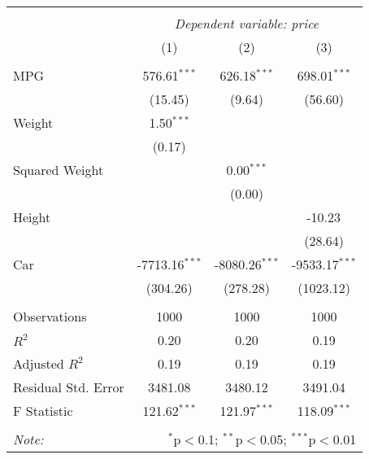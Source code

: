 
\begin{tabular}{@{\extracolsep{5pt}}lccc}
\\[-1.8ex]\hline
\hline \\[-1.8ex]
& \multicolumn{3}{c}{\textit{Dependent variable: price}} \
\cr \cline{2-4}
\\[-1.8ex] & (1) & (2) & (3) \\
\hline \\[-1.8ex]
 MPG & 576.61$^{***}$ & 626.18$^{***}$ & 698.01$^{***}$ \\
& (15.45) & (9.64) & (56.60) \\
 Weight & 1.50$^{***}$ & & \\
& (0.17) & & \\
 Squared Weight & & 0.00$^{***}$ & \\
& & (0.00) & \\
 Height & & & -10.23$^{}$ \\
& & & (28.64) \\
 Car & -7713.16$^{***}$ & -8080.26$^{***}$ & -9533.17$^{***}$ \\
& (304.26) & (278.28) & (1023.12) \\
\hline \\[-1.8ex]
 Observations & 1000 & 1000 & 1000 \\
 $R^2$ & 0.20 & 0.20 & 0.19 \\
 Adjusted $R^2$ & 0.19 & 0.19 & 0.19 \\
 Residual Std. Error & 3481.08 & 3480.12 & 3491.04 \\
 F Statistic & 121.62$^{***}$ & 121.97$^{***}$ & 118.09$^{***}$ \\
\hline
\hline \\[-1.8ex]
\textit{Note:} & \multicolumn{3}{r}{$^{*}$p$<$0.1; $^{**}$p$<$0.05; $^{***}$p$<$0.01} \\
\end{tabular}
